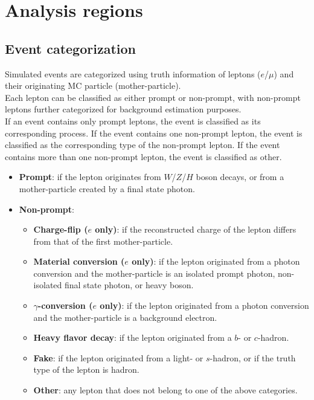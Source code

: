 \documentclass[../thesis.tex]{subfiles}
\begin{document}
\vspace{-1\baselineskip}

\section{Analysis regions}
\label{sec:regions}

\subsection{Event categorization}
Simulated events are categorized using truth information of leptons ($e$/$\mu$) and their originating MC particle (mother-particle).\\
Each lepton can be classified as either prompt or non-prompt, with non-prompt leptons further categorized for background estimation purposes.\\
If an event contains only prompt leptons, the event is classified as its corresponding process. If the event contains one non-prompt lepton, the event is classified as the corresponding type of the non-prompt lepton. If the event contains more than one non-prompt lepton, the event is classified as other.
\begin{itemize}
\item \textbf{Prompt}: if the lepton originates from $W$/$Z$/$H$ boson decays, or from a mother-particle created by a final state photon.
\item \textbf{Non-prompt}:
	\begin{itemize}
	\item \textbf{Charge-flip ($e$ only)}: if the reconstructed charge of the lepton differs from that of the first mother-particle.
	\item \textbf{Material conversion ($e$ only)}: if the lepton originated from a photon conversion and the mother-particle is an isolated prompt photon, non-isolated final state photon, or heavy boson.
	\item \textbf{$\gamma$-conversion ($e$ only)}: if the lepton originated from a photon conversion and the mother-particle is a background electron.
	\item \textbf{Heavy flavor decay}: if the lepton originated from a $b$- or $c$-hadron.
	\item \textbf{Fake}: if the lepton originated from a light- or $s$-hadron, or if the truth type of the lepton is hadron.
	\item \textbf{Other}: any lepton that does not belong to one of the above categories.
	\end{itemize}
\end{itemize}
\end{document}
